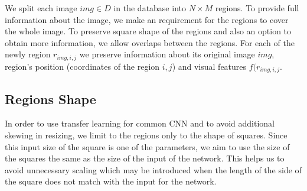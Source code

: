 We split each image  $img \in D$ in the database into $N \times M$ regions. To provide full information about the image, we make an requirement for the regions to cover the whole image. To preserve square shape of the regions and also an option to obtain more information, we allow overlaps between the regions. For each of the newly region $r_{img, i, j}$ we preserve information about its original image $img$, region’s position (coordinates of the region $i, j$) and visual features $f(r_{img, i,j}$.









\subsection{Regions Shape}

In order to use transfer learning for common CNN and to avoid additional skewing in resizing, we limit to the regions only to the shape of squares. Since this input size of the square is one of the parameters, we aim to use the size of the squares the same as the size of the input of the network. This helps us to avoid unnecessary scaling which may be introduced when the length of the side of the square does not match with the input for the network.

